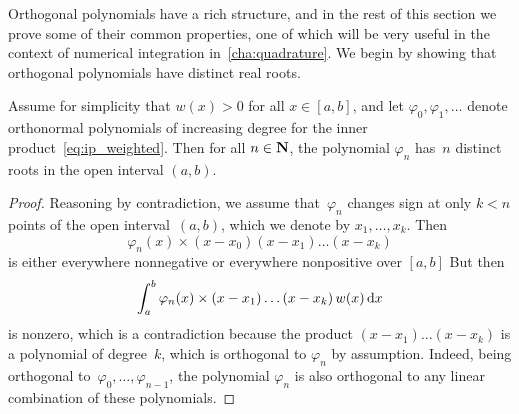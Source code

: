 Orthogonal polynomials have a rich structure,
and in the rest of this section we prove some of their common properties,
one of which will be very useful in the context of numerical integration in~\cref{cha:quadrature}.
We begin by showing that
orthogonal polynomials have distinct real roots.
\begin{proposition}
    \label{proposition:distinct_roots}
    Assume for simplicity that $w(x) > 0$ for all $x \in [a, b]$,
    and let $\varphi_0, \varphi_1, \dotsc$ denote orthonormal polynomials of increasing degree for the inner product~\eqref{eq:ip_weighted}.
    Then for all $n \in \mathbf N$,
    the polynomial $\varphi_n$ has~$n$ distinct roots in the open interval $(a, b)$.
\end{proposition}
\begin{proof}
    Reasoning by contradiction,
    we assume that~$\varphi_n$ changes sign at only $k < n$ points of the open interval~$(a, b)$,
    which we denote by $x_1, \dotsc, x_k$.
    Then
    \[
        \varphi_n(x) \times (x - x_0) (x - x_1) \dotsc (x - x_k)
    \]
    is either everywhere nonnegative or everywhere nonpositive over $[a, b]$
    But then
    \[
        \int_{a}^{b} \varphi_n(x) \times (x - x_1)  \dotsc (x - x_k) \, w(x) \, \mathrm d x
    \]
    is nonzero,
    which is a contradiction because the product $(x-x_1) \dotsc (x-x_k)$ is a polynomial of degree~$k$,
    which is orthogonal to $\varphi_n$ by assumption.
    Indeed, being orthogonal to~$\varphi_0, \dotsc, \varphi_{n-1}$,
    the polynomial $\varphi_n$ is also orthogonal to any linear combination of these polynomials.
\end{proof}

